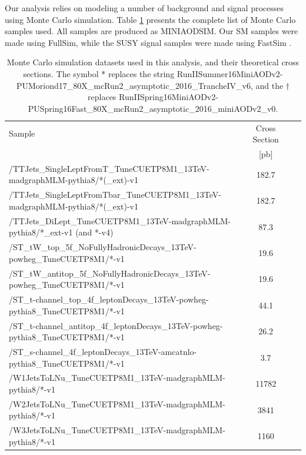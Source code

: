 Our analysis relies on modeling a number of background and signal
processes using Monte Carlo simulation. Table \ref{tab:stop:mcsamples}
presents the complete list of Monte Carlo samples used. All samples
are produced as MINIAODSIM. Our SM samples were made using FullSim,
while the SUSY signal samples were made using FastSim \cite{fastsim}.

\begin{table}[htp]
\caption[Monte Carlo simulation datasets used in this analysis, and
  their theoretical cross sections. The symbols * and $\dagger$ replace
  longer strings.]
  {Monte Carlo simulation datasets used in this analysis, and their
  theoretical cross sections. The symbol * replaces the string
  RunIISummer16MiniAODv2-PUMoriond17\_80X\_mcRun2\_asymptotic\_2016\_TrancheIV\_v6, %
  and the $\dagger$ replaces
  RunIISpring16MiniAODv2-PUSpring16Fast\_80X\_mcRun2\_asymptotic\_2016\_miniAODv2\_v0.}
\label{tab:stop:mcsamples}
\centering
{\footnotesize
\begin{tabular}{|l|c|c|c|}
\hline
Sample & Cross Section \\
& [pb] \\
\hline
/TTJets\_SingleLeptFromT\_TuneCUETP8M1\_13TeV-madgraphMLM-pythia8/*(\_ext)-v1 & 182.7 \\
/TTJets\_SingleLeptFromTbar\_TuneCUETP8M1\_13TeV-madgraphMLM-pythia8/*(\_ext)-v1 & 182.7 \\
/TTJets\_DiLept\_TuneCUETP8M1\_13TeV-madgraphMLM-pythia8/*\_ext-v1 (and *-v4) & 87.3 \\
/ST\_tW\_top\_5f\_NoFullyHadronicDecays\_13TeV-powheg\_TuneCUETP8M1/*-v1 & 19.6 \\
/ST\_tW\_antitop\_5f\_NoFullyHadronicDecays\_13TeV-powheg\_TuneCUETP8M1/*-v1 & 19.6 \\
/ST\_t-channel\_top\_4f\_leptonDecays\_13TeV-powheg-pythia8\_TuneCUETP8M1/*-v1 & 44.1 \\
/ST\_t-channel\_antitop\_4f\_leptonDecays\_13TeV-powheg-pythia8\_TuneCUETP8M1/*-v1 & 26.2 \\
/ST\_s-channel\_4f\_leptonDecays\_13TeV-amcatnlo-pythia8\_TuneCUETP8M1/*-v1 & 3.7 \\
/W1JetsToLNu\_TuneCUETP8M1\_13TeV-madgraphMLM-pythia8/*-v1 & 11782  \\
/W2JetsToLNu\_TuneCUETP8M1\_13TeV-madgraphMLM-pythia8/*-v1 & 3841 \\
/W3JetsToLNu\_TuneCUETP8M1\_13TeV-madgraphMLM-pythia8/*-v1 & 1160 \\

\end{tabular}}
\end{table}
